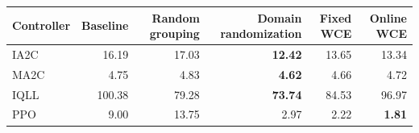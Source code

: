 \begin{tabular}{lrrrrr}
\hline
Controller & Baseline & Random grouping & Domain randomization & Fixed WCE & Online WCE \\
\hline
IA2C & 16.19 & 17.03 & \textbf{12.42} & 13.65 & 13.34 \\
MA2C & 4.75 & 4.83 & \textbf{4.62} & 4.66 & 4.72 \\
IQLL & 100.38 & 79.28 & \textbf{73.74} & 84.53 & 96.97 \\
PPO & 9.00 & 13.75 & 2.97 & 2.22 & \textbf{1.81} \\
\hline
\end{tabular}
